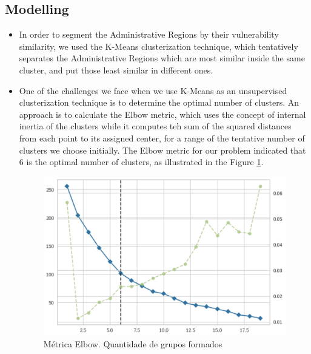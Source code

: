 \documentclass[conference]{IEEEtran}
\begin{document}
\subsection{Modelling}
\begin{itemize}
\item In order to segment the Administrative Regions by their vulnerability similarity, we used the K-Means clusterization technique, which tentatively separates the Administrative Regions which are most similar inside the same cluster, and put those least similar in different ones.
\item One of the challenges we face when we use K-Means as an unsupervised clusterization technique is to determine the optimal number of clusters. An approach is to calculate the Elbow metric, which uses the concept of internal inertia of the clusters while it computes teh sum of the squared distances from each point to its assigned center, for a range of the tentative number of clusters we choose initially. The Elbow metric for our problem indicated that 6 is the optimal number of clusters, as illustrated in the Figure \ref{fig:parametro_modelo}.

\begin{figure}[H]
  \includegraphics[scale=0.30]{parametro_modelo.png}
  \caption{Métrica Elbow. Quantidade de grupos formados}
  \label{fig:parametro_modelo}
\end{figure}

\end{itemize}
\end{document}
